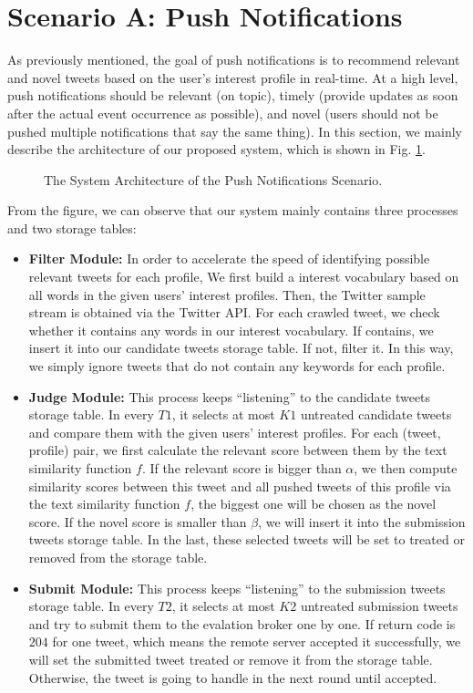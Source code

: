 \section{Scenario A: Push Notifications}
As previously mentioned, the goal of push notifications is to recommend relevant and
novel tweets based on the user’s interest profile in real-time.
At a high level, push notifications should be relevant (on topic),
timely (provide updates as soon after the actual event occurrence as possible),
and novel (users should not be pushed multiple notifications that say the same thing).
In this section, we mainly describe the architecture of our proposed system, which is shown in Fig. \ref{fig:a}.

\begin{figure}[htbp]
\caption{The System Architecture of the Push Notifications Scenario.}
\label{fig:a}
\end{figure}

From the figure, we can observe that our system mainly contains three processes and two storage tables:

\begin{itemize}
\item \textbf{Filter Module:} 
In order to accelerate the speed of identifying possible relevant tweets for each profile,
We first build a interest vocabulary based on all words in the given users' interest profiles.
Then, the Twitter sample stream is obtained via the Twitter API.
For each crawled tweet, we check whether it contains any words in our interest vocabulary.
If contains, we insert it into our candidate tweets storage table. If not, filter it.
In this way, we simply ignore tweets that do not contain any keywords for each profile.

\item \textbf{Judge Module:}
This process keeps ``listening'' to the candidate tweets storage table.
In every $T1$, it selects at most $K1$ untreated candidate tweets and compare them with the given users' interest profiles.
For each (tweet, profile) pair, we first calculate the relevant score between them by the text similarity function $f$.
If the relevant score is bigger than $\alpha$, we then compute similarity scores between this tweet and all pushed tweets of this profile
via the text similarity function $f$, the biggest one will be chosen as the novel score.
If the novel score is smaller than $\beta$, we will insert it into the submission tweets storage table.
In the last, these selected tweets will be set to treated or removed from the storage table.

\item \textbf{Submit Module:}
This process keeps ``listening'' to the submission tweets storage table.
In every $T2$, it selects at most $K2$ untreated submission tweets and try to submit them to the evalation broker one by one.
If return code is $204$ for one tweet, which means the remote server accepted it successfully,
we will set the submitted tweet treated or remove it from the storage table.
Otherwise, the tweet is going to handle in the next round until accepted.
\end{itemize}

